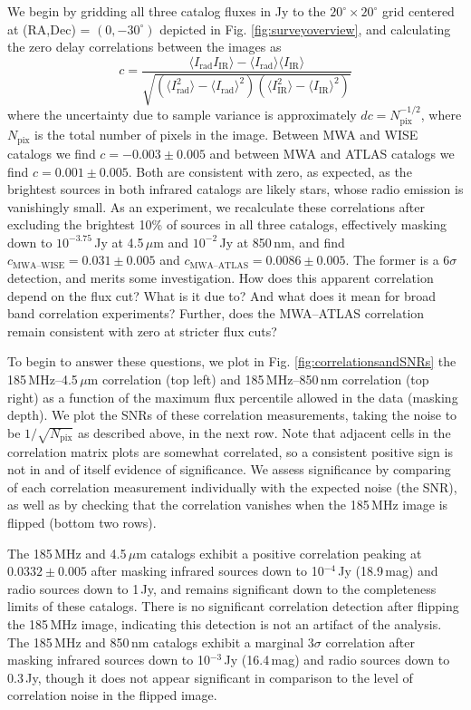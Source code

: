 \documentclass{emulateapj}
\newcommand{\rad}{\text{rad}}
\newcommand{\IR}{\text{IR}}
\begin{document}
We begin by gridding all three catalog fluxes in Jy to the $20^\circ\times20^\circ$ grid centered at (RA,Dec) = $(0, -30^\circ)$ depicted in Fig. \ref{fig:surveyoverview}, and calculating the zero delay correlations between the images as
\begin{equation}
\label{eqn:imagecorrdef}
	c = \frac{\langle I_\rad I_\IR\rangle-\langle I_\rad\rangle\langle I_\IR\rangle}{\sqrt{(\langle I_\rad^2\rangle -\langle I_\rad\rangle^2)(\langle I_\IR^2\rangle -\langle I_\IR\rangle^2)}}
\end{equation}
where the uncertainty due to sample variance is approximately $dc=N_\text{pix}^{-1/2}$, where $N_\text{pix}$ is the total number of pixels in the image. Between MWA and WISE catalogs we find $c=-0.003\pm0.005$ and between MWA and ATLAS catalogs we find $c=0.001\pm0.005$. Both are consistent with zero, as expected, as the brightest sources in both infrared catalogs are likely stars, whose radio emission is vanishingly small. As an experiment, we recalculate these correlations after excluding the brightest 10\% of sources in all three catalogs, effectively masking down to $10^{-3.75}$\,Jy at 4.5\,$\mu$m and $10^{-2}$\,Jy at 850\,nm, and find $c_\text{MWA--WISE}=0.031\pm0.005$ and $c_\text{MWA--ATLAS}=0.0086\pm0.005$. The former is a $6\sigma$ detection, and merits some investigation. How does this apparent correlation depend on the flux cut? What is it due to? And what does it mean for broad band correlation experiments? Further, does the MWA--ATLAS correlation remain consistent with zero at stricter flux cuts?

To begin to answer these questions, we plot in Fig. \ref{fig:correlationsandSNRs} the 185\,MHz--4.5\,$\mu$m correlation (top left) and 185\,MHz--850\,nm correlation (top right) as a function of the maximum flux percentile allowed in the data (masking depth). We plot the SNRs of these correlation measurements, taking the noise to be $1/\sqrt{N_\text{pix}}$ as described above, in the next row. Note that adjacent cells in the correlation matrix plots are somewhat correlated, so a consistent positive sign is not in and of itself evidence of significance. We assess significance by comparing of each correlation measurement individually with the expected noise (the SNR), as well as by checking that the correlation vanishes when the 185\,MHz image is flipped (bottom two rows).

The 185\,MHz and 4.5\,$\mu$m catalogs exhibit a positive correlation peaking at $0.0332\pm0.005$ after masking infrared sources down to 10$^{-4}$\,Jy (18.9\,mag) and radio sources down to 1\,Jy, and remains significant down to the completeness limits of these catalogs. There is no significant correlation detection after flipping the 185\,MHz image, indicating this detection is not an artifact of the analysis. The 185\,MHz and 850\,nm catalogs exhibit a marginal $3\sigma$ correlation after masking infrared sources down to 10$^{-3}$\,Jy (16.4\,mag) and radio sources down to 0.3\,Jy, though it does not appear significant in comparison to the level of correlation noise in the flipped image.
\end{document}

